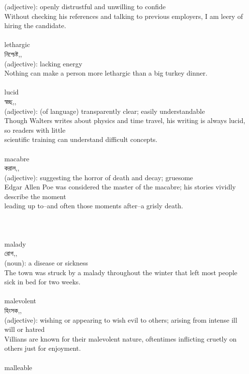 \documentclass{article}
\begin{document}
{(adjective): openly distrustful and unwilling to confide\\Without checking his references and talking to previous employers, I am leery of hiring the candidate.\\}\\
{lethargic}\\
{নিশ্চেষ্ট,,}\\
{(adjective): lacking energy\\Nothing can make a person more lethargic than a big turkey dinner.\\}\\
{lucid}\\
{স্বচ্ছ,,}\\
{(adjective): (of language) transparently clear; easily understandable\\Though Walters writes about physics and time travel, his writing is always lucid, so readers with little\\scientific training can understand difficult concepts.\\}\\
{macabre}\\
{করাল,,}\\
{(adjective): suggesting the horror of death and decay; gruesome\\Edgar Allen Poe was considered the master of the macabre; his stories vividly describe the moment\\leading up to--and often those moments after--a grisly death.\\\\                                                                               \\}\\
{malady}\\
{রোগ,,}\\
{(noun): a disease or sickness\\The town was struck by a malady throughout the winter that left most people sick in bed for two weeks.\\}\\
{malevolent}\\
{হিংসক,,}\\
{(adjective): wishing or appearing to wish evil to others; arising from intense ill will or hatred\\Villians are known for their malevolent nature, oftentimes inflicting cruetly on others just for enjoyment.\\}\\
{malleable}\\
\end{document}
